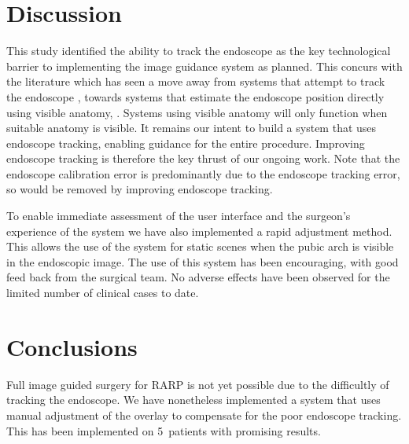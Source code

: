 \documentclass[3p,twocolumn,preprint,10pt]{elsarticle}
\newcommand{\n}{5}
\begin{document}
\section{Discussion}
This study identified the ability to track the endoscope as the key technological barrier 
to implementing the image guidance system as planned. This concurs with the literature which 
has seen a move away from systems that attempt to 
track the endoscope \cite{pap164,pap190,pap188}, towards 
systems that estimate the endoscope position directly using visible anatomy, \cite{pap208,pap203}. 
Systems using visible anatomy will only function when suitable anatomy is visible.
It remains our intent to build a system that uses endoscope tracking, enabling 
guidance for the entire procedure. Improving endoscope tracking is therefore the key thrust 
of our ongoing work. Note that the endoscope calibration error is predominantly due to the endoscope tracking 
error, so would be removed by improving endoscope tracking.

To enable immediate assessment of the user interface and the surgeon's experience of the system 
we have also implemented a rapid adjustment method. This allows the use of the system
for static scenes when the pubic arch is visible in the endoscopic image. The use of this
system has been encouraging, with good feed back from the surgical team. No adverse effects have 
been observed for the limited number of clinical cases to date. 
\section{Conclusions}
Full image guided surgery for RARP is not yet possible due to the difficultly of tracking the endoscope. 
We have nonetheless implemented a system that uses manual adjustment of the overlay to 
compensate for the poor endoscope tracking. This has been implemented on \n \ patients with 
promising results.



\end{document}
